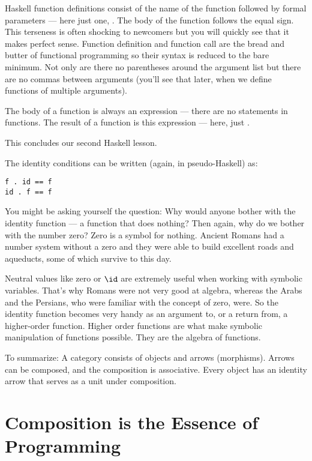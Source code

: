 Haskell function definitions consist of the name of the function
followed by formal parameters --- here just one, . The body of
the function follows the equal sign. This terseness is often shocking to
newcomers but you will quickly see that it makes perfect sense. Function
definition and function call are the bread and butter of functional
programming so their syntax is reduced to the bare minimum. Not only are
there no parentheses around the argument list but there are no commas
between arguments (you'll see that later, when we define functions of
multiple arguments).

The body of a function is always an expression --- there are no
statements in functions. The result of a function is this expression ---
here, just .

This concludes our second Haskell lesson.

The identity conditions can be written (again, in pseudo-Haskell) as:

\begin{Verbatim}
f . id == f
id . f == f
\end{Verbatim}
You might be asking yourself the question: Why would anyone bother with
the identity function --- a function that does nothing? Then again, why
do we bother with the number zero? Zero is a symbol for nothing. Ancient
Romans had a number system without a zero and they were able to build
excellent roads and aqueducts, some of which survive to this day.

Neutral values like zero or $\id$ are extremely useful when
working with symbolic variables. That's why Romans were not very good at
algebra, whereas the Arabs and the Persians, who were familiar with the
concept of zero, were. So the identity function becomes very handy as an
argument to, or a return from, a higher-order function. Higher order
functions are what make symbolic manipulation of functions possible.
They are the algebra of functions.

To summarize: A category consists of objects and arrows (morphisms).
Arrows can be composed, and the composition is associative. Every object
has an identity arrow that serves as a unit under composition.

\section{Composition is the Essence of Programming}

